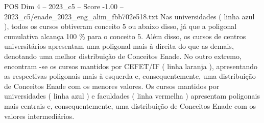 \begin{textsample}{POS Dim 4 – 2023\_c5 – Score -1.00 – 2023\_c5/enade\_2023\_eng\_alim\_fbb702e518.txt}
Nas universidades ( linha azul ), todos os cursos obtiveram conceito 5 ou abaixo disso, já que a poligonal cumulativa alcança 100 \% para o conceito 5.
Além disso, os cursos de centros universitários apresentam uma poligonal mais à direita do que as demais, denotando uma melhor distribuição de Conceitos Enade.
No outro extremo, encontram -se os cursos mantidos por CEFET/IF ( linha laranja ), apresentando as respectivas poligonais mais à esquerda e, consequentemente, uma distribuição de Conceitos Enade com os menores valores.
Os cursos mantidos por universidades ( linha azul ) e faculdades ( linha vermelha ) apresentam poligonais mais centrais e, consequentemente, uma distribuição de Conceitos Enade com os valores intermediários.

\end{textsample}
